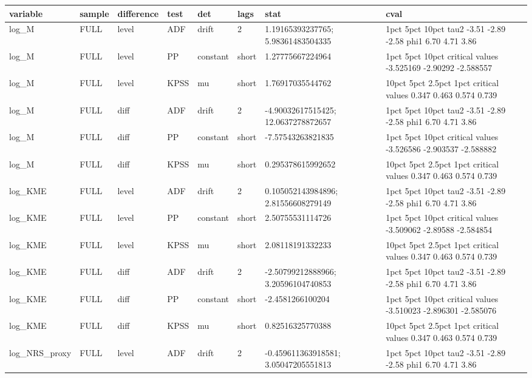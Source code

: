 \begin{tabular}{llllllll}
\hline
variable & sample & difference & test & det & lags & stat & cval \\
\hline
log\_M & FULL & level & ADF & drift & 2 & 1.19165393237765; 5.98361483504335 &       1pct  5pct 10pct tau2 -3.51 -2.89 -2.58 phi1  6.70  4.71  3.86 \\
log\_M & FULL & level & PP & constant & short & 1.27775667224964 &                      1pct     5pct     10pct critical values -3.525169 -2.90292 -2.588557 \\
log\_M & FULL & level & KPSS & mu & short & 1.76917035544762 &                 10pct  5pct 2.5pct  1pct critical values 0.347 0.463  0.574 0.739 \\
log\_M & FULL & diff & ADF & drift & 2 & -4.90032617515425; 12.0637278872657 &       1pct  5pct 10pct tau2 -3.51 -2.89 -2.58 phi1  6.70  4.71  3.86 \\
log\_M & FULL & diff & PP & constant & short & -7.57543263821835 &                      1pct      5pct     10pct critical values -3.526586 -2.903537 -2.588882 \\
log\_M & FULL & diff & KPSS & mu & short & 0.295378615992652 &                 10pct  5pct 2.5pct  1pct critical values 0.347 0.463  0.574 0.739 \\
log\_KME & FULL & level & ADF & drift & 2 & 0.105052143984896; 2.81556608279149 &       1pct  5pct 10pct tau2 -3.51 -2.89 -2.58 phi1  6.70  4.71  3.86 \\
log\_KME & FULL & level & PP & constant & short & 2.50755531114726 &                      1pct     5pct     10pct critical values -3.509062 -2.89588 -2.584854 \\
log\_KME & FULL & level & KPSS & mu & short & 2.08118191332233 &                 10pct  5pct 2.5pct  1pct critical values 0.347 0.463  0.574 0.739 \\
log\_KME & FULL & diff & ADF & drift & 2 & -2.50799212888966; 3.20596104740853 &       1pct  5pct 10pct tau2 -3.51 -2.89 -2.58 phi1  6.70  4.71  3.86 \\
log\_KME & FULL & diff & PP & constant & short & -2.4581266100204 &                      1pct      5pct     10pct critical values -3.510023 -2.896301 -2.585076 \\
log\_KME & FULL & diff & KPSS & mu & short & 0.82516325770388 &                 10pct  5pct 2.5pct  1pct critical values 0.347 0.463  0.574 0.739 \\
log\_NRS\_proxy & FULL & level & ADF & drift & 2 & -0.459611363918581; 3.05047205551813 &       1pct  5pct 10pct tau2 -3.51 -2.89 -2.58 phi1  6.70  4.71  3.86 \\

\end{tabular}
